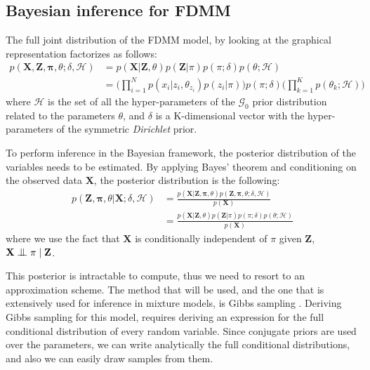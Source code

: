 \subsection{Bayesian inference for FDMM} \label{fdmm-gibbs-subsect}
The full joint distribution of the FDMM model, by looking at the graphical representation factorizes as follows:
\begin{equation}
  \begin{aligned}
	p(\mathbf{X},\mathbf{Z},\mathbf{\pi},\theta;\delta,\mathcal{H}) & = p(\mathbf{X}|\mathbf{Z},\theta) p(\mathbf{Z}|\pi) p(\pi ;\delta) p(\theta ; \mathcal{H}) \\
	   & = \bigg(\prod\limits_{i=1}^{N} p(x_{i}|z_{i},\theta_{z_{i}}) p(z_{i}|\pi)\bigg) p(\pi;\delta) \bigg(\prod\limits_{k=1}^{K} p(\theta_{k}; \mathcal{H})\bigg)
  \end{aligned}
\end{equation}
where $\mathcal{H}$ is the set of all the hyper-parameters of the $\mathcal{G}_{0}$ prior distribution related to the parameters $\theta$, and $\delta$ is a K-dimensional vector with the hyper-parameters of the symmetric \emph{Dirichlet} prior. 

To perform inference in the Bayesian framework, the posterior distribution of the variables needs to be estimated. By applying Bayes' theorem and conditioning on the observed data $\mathbf{X}$, the posterior distribution is the following:
\begin{equation}%
  \begin{aligned}
	p(\mathbf{Z},\mathbf{\pi},\theta|\mathbf{X} ;\delta,\mathcal{H}) & = \frac{p(\mathbf{X}|\mathbf{Z},\mathbf{\pi},\theta) p(\mathbf{Z},\mathbf{\pi},\theta ;\delta,\mathcal{H})}{p(\mathbf{X})} \\
	   & = \frac{p(\mathbf{X}|\mathbf{Z},\theta) p(\mathbf{Z}|\pi) p(\pi;\delta) p(\theta; \mathcal{H})} {p(\mathbf{X})}
  \end{aligned}
\end{equation}
where we use the fact that $\mathbf{X}$ is conditionally independent of $\pi$ given $\mathbf{Z}$, \ie $\mathbf{X} \bigCI \pi \mid \mathbf{Z}$.

This posterior is intractable to compute, thus we need to resort to an approximation scheme. The method that will be used, and the one that is extensively used for inference in mixture models, is Gibbs sampling \citep{Geman1984}. Deriving Gibbs sampling for this model, requires deriving an expression for the full conditional distribution of every random variable. Since conjugate priors are used over the parameters, we can write analytically the full conditional distributions, and also we can easily draw samples from them.

